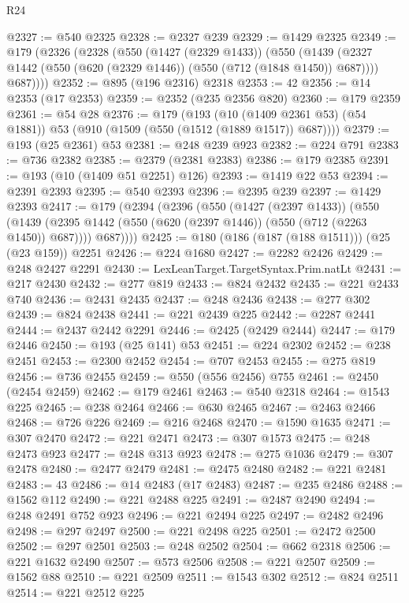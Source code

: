 \begin{lexlean}{R24}
\begin{coremodule}
@2327 := @540 @2325
@2328 := @2327 @239
@2329 := @1429 @2325
@2349 := @179
    (@2326
      (@2328
        (@550
          (@1427 (@2329 @1433))
          (@550
            (@1439 (@2327 @1442 (@550 (@620 (@2329 @1446)) (@550 (@712 (@1848 @1450)) @687))))
            @687))))
@2352 := @895 (@196 @2316) @2318
@2353 := 42
@2356 := @14 @2353 (@17 @2353)
@2359 := @2352 (@235 @2356 @820)
@2360 := @179 @2359
@2361 := @54 @28
@2376 := @179
    (@193 (@10 (@1409 @2361 @53) (@54 @1881)) @53 (@910 (@1509 (@550 (@1512 (@1889 @1517)) @687))))
@2379 := @193 (@25 @2361) @53
@2381 := @248 @239 @923
@2382 := @224 @791
@2383 := @736 @2382
@2385 := @2379 (@2381 @2383)
@2386 := @179 @2385
@2391 := @193 (@10 (@1409 @51 @2251) @126)
@2393 := @1419 @22 @53
@2394 := @2391 @2393
@2395 := @540 @2393
@2396 := @2395 @239
@2397 := @1429 @2393
@2417 := @179
    (@2394
      (@2396
        (@550
          (@1427 (@2397 @1433))
          (@550
            (@1439 (@2395 @1442 (@550 (@620 (@2397 @1446)) (@550 (@712 (@2263 @1450)) @687))))
            @687))))
@2425 := @180 (@186 (@187 (@188 @1511))) (@25 (@23 @159)) @2251
@2426 := @224 @1680
@2427 := @2282 @2426
@2429 := @248 @2427 @2291
@2430 := LexLeanTarget.TargetSyntax.Prim.natLt
@2431 := @217 @2430
@2432 := @277 @819
@2433 := @824 @2432
@2435 := @221 @2433 @740
@2436 := @2431 @2435
@2437 := @248 @2436
@2438 := @277 @302
@2439 := @824 @2438
@2441 := @221 @2439 @225
@2442 := @2287 @2441
@2444 := @2437 @2442 @2291
@2446 := @2425 (@2429 @2444)
@2447 := @179 @2446
@2450 := @193 (@25 @141) @53
@2451 := @224 @2302
@2452 := @238 @2451
@2453 := @2300 @2452
@2454 := @707 @2453
@2455 := @275 @819
@2456 := @736 @2455
@2459 := @550 (@556 @2456) @755
@2461 := @2450 (@2454 @2459)
@2462 := @179 @2461
@2463 := @540 @2318
@2464 := @1543 @225
@2465 := @238 @2464
@2466 := @630 @2465
@2467 := @2463 @2466
@2468 := @726 @226
@2469 := @216 @2468
@2470 := @1590 @1635
@2471 := @307 @2470
@2472 := @221 @2471
@2473 := @307 @1573
@2475 := @248 @2473 @923
@2477 := @248 @313 @923
@2478 := @275 @1036
@2479 := @307 @2478
@2480 := @2477 @2479
@2481 := @2475 @2480
@2482 := @221 @2481
@2483 := 43
@2486 := @14 @2483 (@17 @2483)
@2487 := @235 @2486
@2488 := @1562 @112
@2490 := @221 @2488 @225
@2491 := @2487 @2490
@2494 := @248 @2491 @752 @923
@2496 := @221 @2494 @225
@2497 := @2482 @2496
@2498 := @297 @2497
@2500 := @221 @2498 @225
@2501 := @2472 @2500
@2502 := @297 @2501
@2503 := @248 @2502
@2504 := @662 @2318
@2506 := @221 @1632 @2490
@2507 := @573 @2506
@2508 := @221 @2507
@2509 := @1562 @88
@2510 := @221 @2509
@2511 := @1543 @302
@2512 := @824 @2511
@2514 := @221 @2512 @225

\end{coremodule}
\end{lexlean}
